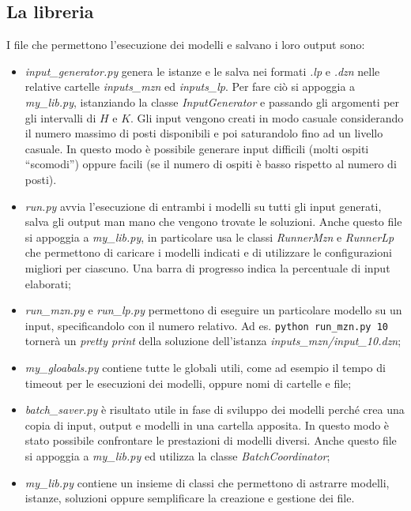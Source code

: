 \subsection{La libreria}
I file che permettono l'esecuzione dei modelli e salvano i loro output sono:
\begin{itemize}
  \item \emph{input\_generator.py} genera le istanze e le salva nei formati \emph{.lp} e \emph{.dzn} nelle relative cartelle \emph{inputs\_mzn} ed \emph{inputs\_lp}.
    Per fare ciò si appoggia a \emph{my\_lib.py}, istanziando la classe \emph{InputGenerator} e passando gli argomenti per gli intervalli di $H$ e $K$.
    Gli input vengono creati in modo casuale considerando il numero massimo di posti disponibili e poi saturandolo fino ad un livello casuale.
    In questo modo è possibile generare input difficili (molti ospiti ``scomodi'') oppure facili (se il numero di ospiti è basso rispetto al numero di posti).

  \item \emph{run.py} avvia l'esecuzione di entrambi i modelli su tutti gli input generati, salva gli output man mano che vengono trovate le soluzioni.
    Anche questo file si appoggia a \emph{my\_lib.py}, in particolare usa le classi \emph{RunnerMzn} e \emph{RunnerLp} che permettono di caricare i modelli indicati e di utilizzare le configurazioni migliori per ciascuno.
    Una barra di progresso indica la percentuale di input elaborati;

  \item \emph{run\_mzn.py} e \emph{run\_lp.py} permettono di eseguire un particolare modello su un input, specificandolo con il numero relativo. Ad es. \lstinline{python run_mzn.py 10} tornerà un \emph{pretty print} della soluzione dell'istanza \emph{inputs\_mzn/input\_10.dzn};

  \item \emph{my\_gloabals.py} contiene tutte le globali utili, come ad esempio il tempo di timeout per le esecuzioni dei modelli, oppure nomi di cartelle e file;

  \item \emph{batch\_saver.py} è risultato utile in fase di sviluppo dei modelli perché crea una copia di input, output e modelli in una cartella apposita.
  In questo modo è stato possibile confrontare le prestazioni di modelli diversi.
  Anche questo file si appoggia a \emph{my\_lib.py} ed utilizza la classe \emph{BatchCoordinator};

  \item \emph{my\_lib.py} contiene un insieme di classi che permettono di astrarre modelli, istanze, soluzioni oppure semplificare la creazione e gestione dei file.
\end{itemize}
